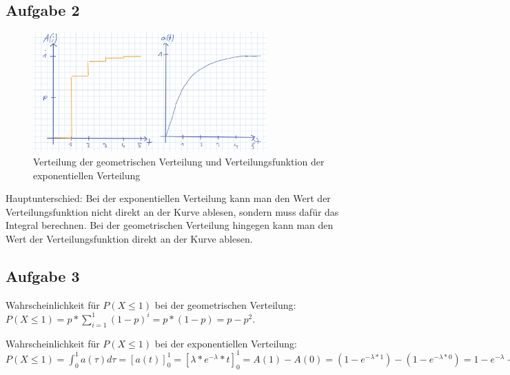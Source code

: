 \documentclass[%
10pt,              %
ngerman,           %
a4paper,           %
DIV11,             %
]{scrartcl}%
\begin{document}
\newpage
\subsection*{Aufgabe 2}
     
\begin{figure}[!htbp]
  \centering
    \caption{Verteilung der geometrischen Verteilung und Verteilungsfunktion der exponentiellen Verteilung}
    \includegraphics[width=0.8\textwidth]{a4vertfkt}
\end{figure}
Hauptunterschied: Bei der exponentiellen Verteilung kann man den Wert der Verteilungsfunktion nicht direkt an der Kurve ablesen, sondern muss dafür das Integral berechnen. Bei der geometrischen Verteilung hingegen kann man den Wert der Verteilungsfunktion direkt an der Kurve ablesen. 

\subsection*{Aufgabe 3}

Wahrscheinlichkeit für $P(X \leq 1)$ bei der geometrischen Verteilung:\newline
$P(X \leq 1) = p * \sum_{i = 1}^{1} (1-p)^i = p * (1-p) = p - p^2$.\newline

Wahrscheinlichkeit für $P(X \leq 1)$ bei der exponentiellen Verteilung:\newline
$P(X \leq 1) = \int_{0}^{1} a(\tau) d\tau = [a(t)]_0^1 = [\lambda * e^{-\lambda} * t]_0^1 = A(1) - A(0) = (1 - e^{-\lambda * 1}) - (1 - e^{-\lambda * 0}) = 1 - e^{-\lambda} - 1 + 1 = 1 - e^{- \lambda}$ 
\end{document}
